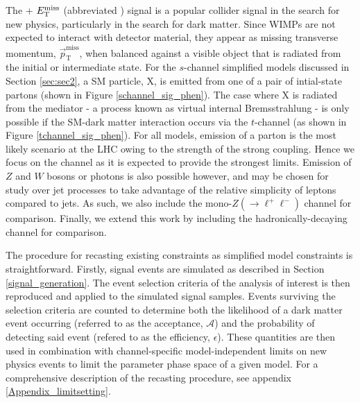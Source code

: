 The \monoX + $E_{\mathrm{T}}^{\mathrm{miss}}$ (abbreviated \monoX) signal is a popular collider signal in the search for new physics, particularly in the search for dark matter. Since WIMPs are not expected to interact with detector material, they appear as missing transverse momentum, $\vec{p}_{\mathrm{T}}^{\mathrm{miss}}$, when balanced against a visible object that is radiated from the initial or intermediate state.
For the $s$-channel simplified models discussed in Section \ref{sec:sec2}, a SM particle, X, is emitted from one of a pair of intial-state partons (shown in Figure \ref{schannel_sig_phen}). The case where X is radiated from the mediator - a process known as virtual internal Bremsstrahlung - is only possible if the SM-dark matter interaction occurs via the $t$-channel (as shown in Figure \ref{tchannel_sig_phen}).
For all models, emission of a parton is the most likely scenario at the LHC owing to the strength of the strong coupling. Hence we focus on the \monojet channel as it is expected to provide the strongest limits. Emission of $Z$ and $W$ bosons or photons is also possible however, and may be chosen for study over jet processes to take advantage of the relative simplicity of leptons compared to jets. As such, we also include the mono-$Z(\rightarrow \ell^+ \ell^-)$ channel for comparison. Finally, we extend this work by including the hadronically-decaying \monoWZ channel for comparison.




The procedure for recasting existing \monoX constraints as simplified model constraints is straightforward. Firstly, signal events are simulated as described in Section \ref{signal_generation}. The event selection criteria of the \monoX analysis of interest is then reproduced and applied to the simulated signal samples. Events surviving the selection criteria are counted to determine both the likelihood of a dark matter event occurring (referred to as the acceptance, $\mathcal{A}$) and the probability of detecting said event (refered to as the efficiency, $\epsilon$). These quantities are then used in combination with channel-specific model-independent limits on new physics events to limit the parameter phase space of a given model.
For a comprehensive description of the recasting procedure, see appendix \ref{Appendix_limitsetting}.

